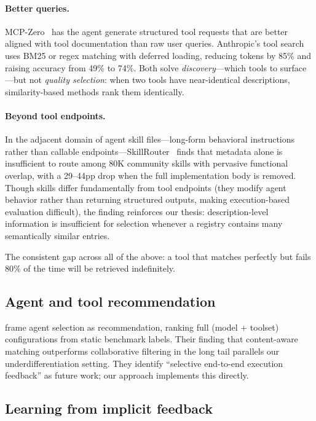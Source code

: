 \documentclass{article}
\begin{document}
\paragraph{Better queries.} MCP-Zero~\citep{fei2025mcpzero} has the agent generate structured tool requests that are better aligned with tool documentation than raw user queries. Anthropic's tool search~\citep{anthropic2025toolsearch} uses BM25 or regex matching with deferred loading, reducing tokens by 85\% and raising accuracy from 49\% to 74\%. Both solve \emph{discovery}---which tools to surface---but not \emph{quality selection}: when two tools have near-identical descriptions, similarity-based methods rank them identically.

\paragraph{Beyond tool endpoints.} In the adjacent domain of agent skill files---long-form behavioral instructions rather than callable endpoints---SkillRouter~\citep{zheng2026skillrouter} finds that metadata alone is insufficient to route among 80K community skills with pervasive functional overlap, with a 29--44pp drop when the full implementation body is removed. Though skills differ fundamentally from tool endpoints (they modify agent behavior rather than returning structured outputs, making execution-based evaluation difficult), the finding reinforces our thesis: description-level information is insufficient for selection whenever a registry contains many semantically similar entries.

The consistent gap across all of the above: a tool that matches perfectly but fails 80\% of the time will be retrieved indefinitely.

\subsection{Agent and tool recommendation}

\citet{shi2026agentselect} frame agent selection as recommendation, ranking full (model + toolset) configurations from static benchmark labels. Their finding that content-aware matching outperforms collaborative filtering in the long tail parallels our underdifferentiation setting. They identify ``selective end-to-end execution feedback'' as future work; our approach implements this directly.

\subsection{Learning from implicit feedback}
\end{document}
